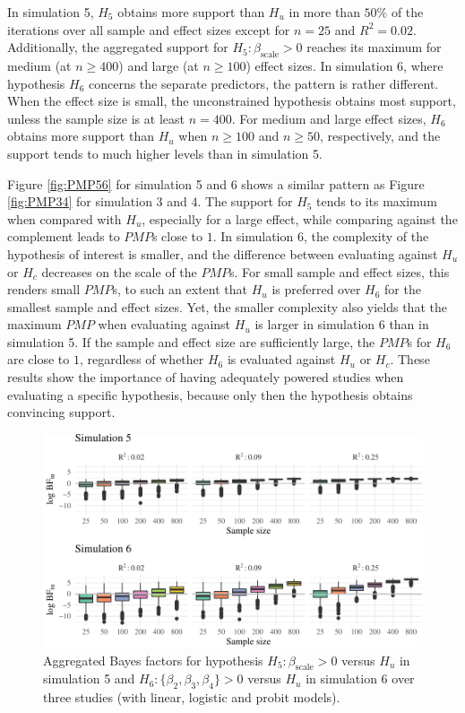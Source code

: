 \documentclass[review, 3p, authoryear]{elsarticle} %
\begin{document}
In simulation 5, \(H_5\) obtains more support than \(H_u\) in more than \(50\%\) of the iterations over all sample and effect sizes except for \(n = 25\) and \(R^2 = 0.02\).
Additionally, the aggregated support for \(H_5: \beta_{\text{scale}}>0\) reaches its maximum for medium (at \(n \geq 400\)) and large (at \(n \geq 100\)) effect sizes.
In simulation 6, where hypothesis \(H_6\) concerns the separate predictors, the pattern is rather different.
When the effect size is small, the unconstrained hypothesis obtains most support, unless the sample size is at least \(n = 400\).
For medium and large effect sizes, \(H_6\) obtains more support than \(H_u\) when \(n \geq 100\) and \(n \geq 50\), respectively, and the support tends to much higher levels than in simulation 5.

Figure \ref{fig:PMP56} for simulation 5 and 6 shows a similar pattern as Figure \ref{fig:PMP34} for simulation 3 and 4.
The support for \(H_5\) tends to its maximum when compared with \(H_u\), especially for a large effect, while comparing against the complement leads to \(PMP\)s close to \(1\).
In simulation 6, the complexity of the hypothesis of interest is smaller, and the difference between evaluating against \(H_u\) or \(H_c\) decreases on the scale of the \(PMP\)s.
For small sample and effect sizes, this renders small \(PMP\)s, to such an extent that \(H_u\) is preferred over \(H_6\) for the smallest sample and effect sizes.
Yet, the smaller complexity also yields that the maximum \(PMP\) when evaluating against \(H_u\) is larger in simulation 6 than in simulation 5.
If the sample and effect size are sufficiently large, the \(PMP\)s for \(H_6\) are close to \(1\), regardless of whether \(H_6\) is evaluated against \(H_u\) or \(H_c\).
These results show the importance of having adequately powered studies when evaluating a specific hypothesis, because only then the hypothesis obtains convincing support.

\begin{figure}
\includegraphics[width=1\linewidth]{manuscript_volker_files/figure-latex/BF56-1} \caption{Aggregated Bayes factors for hypothesis $H_5: \beta_{\text{scale}} > 0$ versus $H_u$ in simulation 5 and $H_6: \{\beta_2, \beta_3, \beta_4\} > 0$ versus $H_u$ in simulation 6 over three studies (with linear, logistic and probit models).}\label{fig:BF56}
\end{figure}
\end{document}
